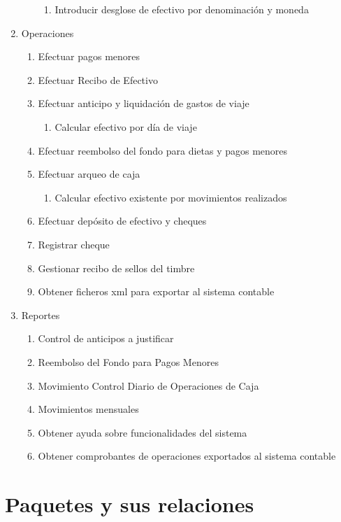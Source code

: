 \begin{enumerate}
\begin{enumerate}
		\begin{enumerate}
			\item Introducir desglose de efectivo por denominación y moneda
		\end{enumerate}
	\end{enumerate}
	\item Operaciones
	\begin{enumerate}
		\item Efectuar pagos menores
		\item Efectuar Recibo de Efectivo
		\item Efectuar anticipo y liquidación de gastos de viaje
		\begin{enumerate}
			\item Calcular efectivo por día de viaje
		\end{enumerate}
		\item Efectuar reembolso del fondo para dietas y pagos menores
		\item Efectuar arqueo de caja
		\begin{enumerate}
			\item Calcular efectivo existente por movimientos realizados
		\end{enumerate}
		\item Efectuar depósito de efectivo y cheques
		\item Registrar cheque
		\item Gestionar recibo de sellos del timbre
		\item Obtener ficheros xml para exportar al sistema contable
	\end{enumerate}
	\item Reportes
	\begin{enumerate}
		\item Control de anticipos a justificar
		\item Reembolso del Fondo para Pagos Menores
		\item Movimiento Control Diario de Operaciones de Caja
		\item Movimientos mensuales
		\item Obtener ayuda sobre funcionalidades del sistema
		\item Obtener comprobantes de operaciones exportados al sistema contable
	\end{enumerate}
\end{enumerate}

\section{Paquetes y sus relaciones}
